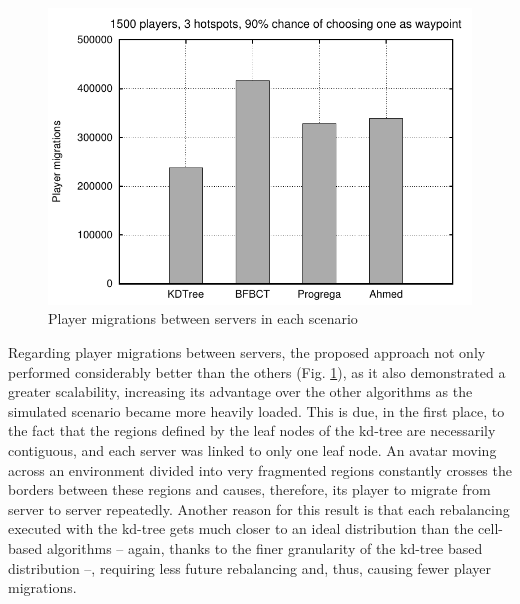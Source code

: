 \documentclass[acmjacm]{acmtrans2m}
\newcommand{\figurecaption}{Fig.}
\begin{document}
\begin{figure}[!t]
	\includegraphics[width=0.49\linewidth]{data/1500players_prob90/migrations}
	\caption{Player migrations between servers in each scenario}
	\label{fig:migrations}
\end{figure}

Regarding player migrations between servers, the proposed approach not only performed considerably better than the others (\figurecaption{} \ref{fig:migrations}), as it also demonstrated a greater scalability, increasing its advantage over the other algorithms as the simulated scenario became more heavily loaded. This is due, in the first place, to the fact that the regions defined by the leaf nodes of the kd-tree are necessarily contiguous, and each server was linked to only one leaf node. An avatar moving across an environment divided into very fragmented regions constantly crosses the borders between these regions and causes, therefore, its player to migrate from server to server repeatedly. Another reason for this result is that each rebalancing executed with the kd-tree gets much closer to an ideal distribution than the cell-based algorithms -- again, thanks to the finer granularity of the kd-tree based distribution --, requiring less future rebalancing and, thus, causing fewer player migrations.
\end{document}
